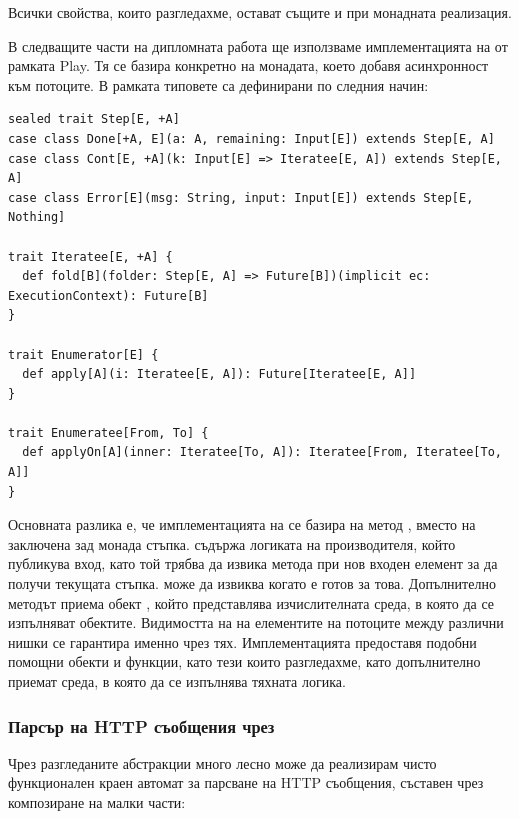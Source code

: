 Всички свойства, които разгледахме, остават същите и при монадната реализация.

В следващите части на дипломната работа ще използваме имплементацията на  от рамката Play. Тя се базира конкретно на  монадата, което добавя асинхронност към потоците. В рамката типовете са дефинирани по следния начин:

\begin{lstlisting}
sealed trait Step[E, +A]
case class Done[+A, E](a: A, remaining: Input[E]) extends Step[E, A]
case class Cont[E, +A](k: Input[E] => Iteratee[E, A]) extends Step[E, A]
case class Error[E](msg: String, input: Input[E]) extends Step[E, Nothing]

trait Iteratee[E, +A] {
  def fold[B](folder: Step[E, A] => Future[B])(implicit ec: ExecutionContext): Future[B]
}

trait Enumerator[E] {
  def apply[A](i: Iteratee[E, A]): Future[Iteratee[E, A]]
}

trait Enumeratee[From, To] {
  def applyOn[A](inner: Iteratee[To, A]): Iteratee[From, Iteratee[To, A]]
}
\end{lstlisting}

Основната разлика е, че имплементацията на  се базира на метод , вместо на заключена зад монада стъпка.  съдържа логиката на производителя, който публикува вход, като той трябва да извика  метода при нов входен елемент за да получи текущата стъпка.  може да извиква  когато е готов за това. Допълнително методът приема обект , който представлява изчислителната среда, в която да се изпълняват  обектите. Видимостта на на елементите на потоците между различни нишки се гарантира именно чрез тях. Имплементацията предоставя подобни помощни обекти и функции, като тези които разгледахме, като допълнително приемат среда, в която да се изпълнява тяхната логика.

\subsubsection{Парсър на HTTP съобщения чрез }

Чрез разгледаните абстракции много лесно може да реализирам чисто функционален краен автомат за парсване на HTTP съобщения, съставен чрез композиране на малки части:



